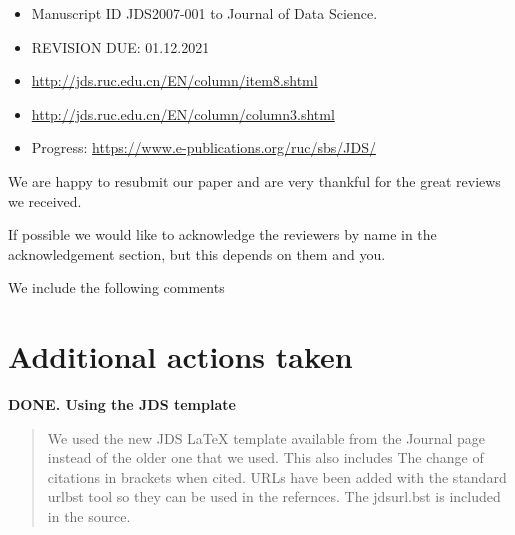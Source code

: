 




\newcommand{\REVIEW}[3]{
  \begin{tcolorbox}[colback={#1}]
    {\bf {#1}. {#2}}
 \end{tcolorbox}
  \begin{quote}
    {#3}
  \end{quote}
}


\bigskip

\begin{itemize}
\item Manuscript ID JDS2007-001 to Journal of Data Science.

\item REVISION DUE: 01.12.2021

\item \url{http://jds.ruc.edu.cn/EN/column/item8.shtml}

\item \url{http://jds.ruc.edu.cn/EN/column/column3.shtml}

\item Progress: \url{https://www.e-publications.org/ruc/sbs/JDS/} 

\end{itemize}



\bigskip

\parindent 0pt We are happy to resubmit our paper and are very thankful for the great reviews we received. 

If possible we would like to acknowledge the reviewers by name in the
acknowledgement section, but this depends on them and you.

We include the following comments

\section*{Additional actions taken}


\REVIEW{DONE}{Using the JDS template} {We used the new JDS \LaTeX
  template available from the Journal page instead of the older one
  that we used. This also includes The change of citations in brackets
  when cited. URLs have been added with the standard urlbst tool so
  they can be used in the refernces. The jdsurl.bst is included in the
  source.}



